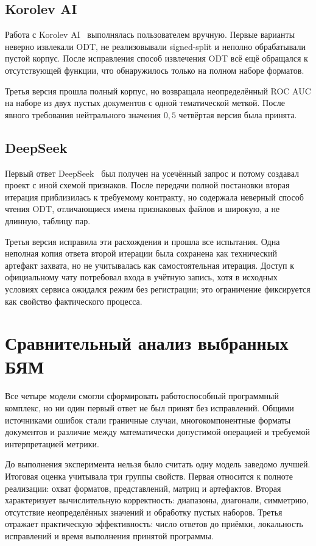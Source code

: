 \documentclass[a4paper,12pt]{extreport}
\begin{document}
\subsection{Korolev AI}

Работа с Korolev AI~\cite{korolev} выполнялась пользователем вручную. Первые варианты неверно извлекали ODT, не реализовывали signed-split и неполно обрабатывали пустой корпус. После исправления способ извлечения ODT всё ещё обращался к отсутствующей функции, что обнаружилось только на полном наборе форматов.

Третья версия прошла полный корпус, но возвращала неопределённый ROC AUC на наборе из двух пустых документов с одной тематической меткой. После явного требования нейтрального значения $0{,}5$ четвёртая версия была принята.

\subsection{DeepSeek}

Первый ответ DeepSeek~\cite{deepseek} был получен на усечённый запрос и потому создавал проект с иной схемой признаков. После передачи полной постановки вторая итерация приблизилась к требуемому контракту, но содержала неверный способ чтения ODT, отличающиеся имена признаковых файлов и широкую, а не длинную, таблицу пар.

Третья версия исправила эти расхождения и прошла все испытания. Одна неполная копия ответа второй итерации была сохранена как технический артефакт захвата, но не учитывалась как самостоятельная итерация. Доступ к официальному чату потребовал входа в учётную запись, хотя в исходных условиях сервиса ожидался режим без регистрации; это ограничение фиксируется как свойство фактического процесса.

\section{Сравнительный анализ выбранных БЯМ}

Все четыре модели смогли сформировать работоспособный программный комплекс, но ни один первый ответ не был принят без исправлений. Общими источниками ошибок стали граничные случаи, многокомпонентные форматы документов и различие между математически допустимой операцией и требуемой интерпретацией метрики.

До выполнения эксперимента нельзя было считать одну модель заведомо лучшей. Итоговая оценка учитывала три группы свойств. Первая относится к полноте реализации: охват форматов, представлений, матриц и артефактов. Вторая характеризует вычислительную корректность: диапазоны, диагонали, симметрию, отсутствие неопределённых значений и обработку пустых наборов. Третья отражает практическую эффективность: число ответов до приёмки, локальность исправлений и время выполнения принятой программы.
\end{document}
